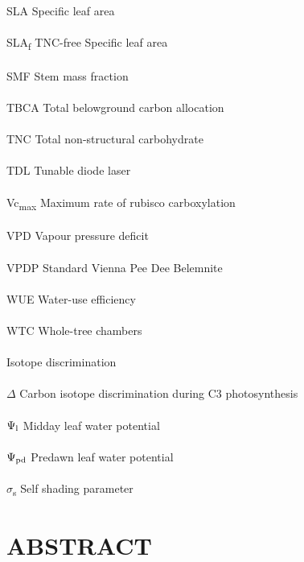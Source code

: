 \documentclass[a4paper]{article}
\begin{document}
SLA Specific leaf area
\\
\\
SLA\textsubscript{f}  TNC-free Specific leaf area
\\
\\
SMF Stem mass fraction
\\
\\
TBCA Total belowground carbon allocation
\\
\\
TNC Total non-structural carbohydrate
\\
\\
TDL Tunable diode laser
\\
\\
Vc\textsubscript{max} Maximum rate of rubisco carboxylation 
\\
\\
VPD Vapour pressure deficit
\\
\\
VPDP Standard Vienna Pee Dee Belemnite
\\
\\
WUE Water-use efficiency
\\
\\
WTC Whole-tree chambers
\\
\\
{\textdelta}  Isotope discrimination
\\
\\
$\Delta$ Carbon isotope discrimination during C3 photosynthesis 
\\
\\
$\Psi\textsubscript{l}$ Midday leaf water potential
\\
\\
$\Psi\textsubscript{pd}$  Predawn leaf water potential
\\
\\
$\sigma$\textsubscript{s} Self shading parameter

\clearpage
\section*{ABSTRACT}
\end{document}
